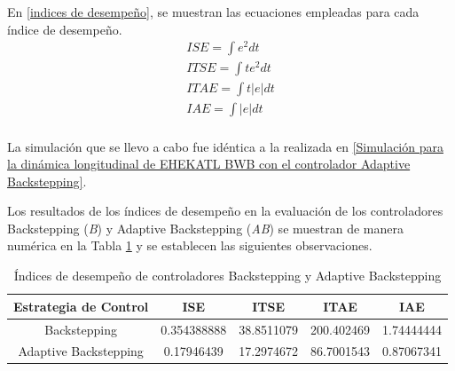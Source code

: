 En \ref{indices de desempeño}, se muestran las ecuaciones empleadas para cada índice de desempeño. 
\begin{align}
\label{indices de desempeño}
    ISE = \int e^2  dt \\ \nonumber
    ITSE = \int t e^2 dt \\ \nonumber
    ITAE = \int t |e| dt \\ \nonumber
    IAE = \int |e| dt \\ \nonumber
\end{align}

%
La simulación que se llevo a cabo fue idéntica a la realizada en \ref{Simulación para la dinámica longitudinal de EHEKATL BWB con el controlador Adaptive Backstepping}.

Los resultados de los índices de desempeño en la evaluación de los controladores Backstepping (\textit{B}) y Adaptive Backstepping (\textit{AB}) se muestran de manera numérica en la Tabla \ref{Indices de desempeño de controladores Backstepping y Adaptive Backstepping} y se establecen las siguientes observaciones.

\begin{table}[!h]
    \caption{Índices de desempeño de controladores Backstepping y Adaptive Backstepping}
    \centering
    \begin{tabular}{|c|c|c|c|c|}
    \hline
    \textbf{Estrategia de Control} & \textbf{ISE} & \textbf{ITSE} & \textbf{ITAE} & \textbf{IAE} \\
    \hline
    Backstepping  & 0.354388888 & 38.8511079 & 200.402469 & 1.74444444 \\
    Adaptive Backstepping & 0.17946439 & 17.2974672 & 86.7001543 & 0.87067341 \\
    \hline
    \end{tabular}
    \label{Indices de desempeño de controladores Backstepping y Adaptive Backstepping}
\end{table}



